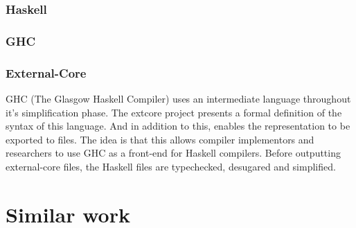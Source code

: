 
\subsubsection{Haskell}


\subsubsection{GHC}


\subsubsection{External-Core}

GHC (The Glasgow Haskell Compiler) uses an intermediate language throughout it's 
simplification phase. The extcore project presents a formal definition of the syntax 
of this language. And in addition to this, enables the representation to be exported 
to files. The idea is that this allows compiler implementors and researchers to use GHC
as a front-end for Haskell compilers. Before outputting external-core files,
the Haskell files are typechecked, desugared and simplified. \cite{tolmach2010ghc}

\begin{comment}
The linkcore project implements a linker for core programs, i.e. it transforms
a single Haskell module into a single closed external-core module. In addition to
this, since the linker requires external-core representation of the ghc-libraries,
it also contains instructions on how to create these. 
\end{comment}




\section{Similar work}






